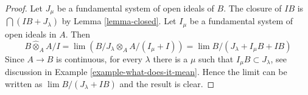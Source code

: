 \documentclass{stacks-project}
\theoremstyle{plain}
\theoremstyle{definition}
\theoremstyle{remark}
\numberwithin{equation}{subsection}
\def\lim{\mathop{\mathrm{lim}}\nolimits}
\begin{document}
\begin{proof}
Let $J_\mu$ be a fundamental system of open ideals of $B$.
The closure of $IB$ is $\bigcap (IB + J_\lambda)$ by Lemma \ref{lemma-closed}.
Let $I_\mu$ be a fundamental system of open ideals in $A$.
Then
$$
B \widehat{\otimes}_A A/I = \lim (B/J_\lambda \otimes_A A/(I_\mu + I)) =
\lim B/(J_\lambda + I_\mu B + I B)
$$
Since $A \to B$ is continuous, for every $\lambda$ there
is a $\mu$ such that $I_\mu B \subset J_\lambda$, see discussion in
Example \ref{example-what-does-it-mean}. Hence the limit
can be written as $\lim B/(J_\lambda + IB)$ and the result is clear.
\end{proof}
\end{document}
